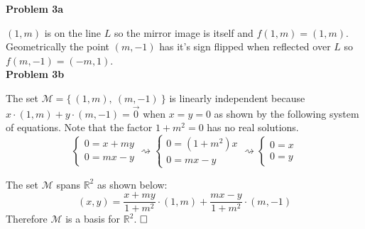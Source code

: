 \documentclass[fleqn]{article}
\newcommand{\squig}[0]{\ensuremath{\rightsquigarrow}}
\newcommand{\problem}[1]{\large\textbf{Problem #1}\normalsize}
\newcommand{\qed}{\hfill\ensuremath{\square}}
\begin{document}
\problem{3a}

$(1, m)$ is on the line $L$ so the mirror image is itself and
$f(1, m) = (1, m)$. Geometrically the point $(m, -1)$ has it's sign flipped when
reflected over $L$ so $f(m, -1) = (-m, 1)$. \\

\problem{3b}

The set $\mathcal{M} = \{ \: (1, m), \: (m, -1) \: \}$ is linearly independent because
$x\cdot(1, m) + y \cdot (m, -1) = \vec{0}$ when $x = y = 0$ as shown by the following
system of equations. Note that the factor $1 + m^2 = 0$ has no real solutions.
\begin{equation*}
  \begin{cases}
    0 = x + my \\
    0 = mx - y
  \end{cases}
  \squig
  \begin{cases}
    0 = (1 + m^2) x \\
    0 = mx - y
  \end{cases}
  \squig
  \begin{cases}
    0 = x \\
    0 = y
  \end{cases}
\end{equation*}

The set $\mathcal{M}$ spans $\mathbb{R}^2$ as shown below:
\begin{equation*}
(x, y) =
\frac{x + my}{1 + m^2} \cdot (1, m) +
\frac{mx - y}{1 + m^2} \cdot (m,-1)
\end{equation*}
Therefore $\mathcal{M}$ is a basis for $\mathbb{R}^2$. $\qed$ \\
\end{document}
